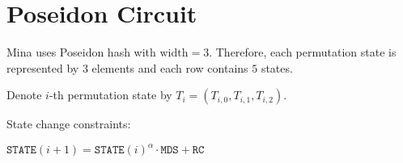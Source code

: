 \section{Poseidon Circuit}
\label{section:poseidon}

Mina uses Poseidon hash with $\text{width} = 3$.
Therefore, each permutation state is represented by $3$ elements and each row contains $5$ states.


Denote $i$-th permutation state by $T_i = (T_{i, 0}, T_{i, 1}, T_{i, 2})$.

\begin{center}
    \begin{table}[H]
    \end{table}
\end{center}

State change constraints:
\begin{center}
    $\texttt{STATE}(i+1) = \texttt{STATE}(i)^\alpha \cdot \texttt{MDS} + \texttt{RC}$
\end{center}


